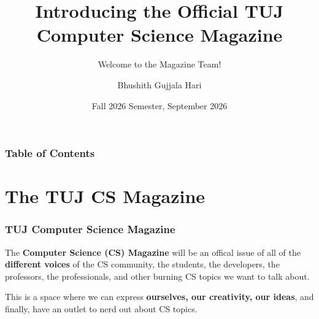 \documentclass{beamer}
\title[Computer Science Magazine]{Introducing the Official TUJ Computer Science Magazine}
\subtitle{Welcome to the Magazine Team!}
\author{Bhushith Gujjala Hari}
\institute{Temple University Japan}
\date[Fall 2026]{Fall 2026 Semester, September 2026}
\begin{document}



\frame{\titlepage}


\begin{frame}
    \frametitle{Table of Contents}
    \tableofcontents
\end{frame}


\section{The TUJ CS Magazine}
\begin{frame}
    \frametitle{TUJ Computer Science Magazine}

    The \textbf{Computer Science (CS) Magazine} will be an offical issue of all of the \textbf{different voices} of the CS community, the students, the developers, the professors, the professionals, and other burning CS topics we want to talk about.

    \hspace{0.4pt}
    \pause

    This is a space where we can express \textbf{ourselves, our creativity, our ideas}, and finally, have an outlet to nerd out about CS topics.  


\end{frame}


\end{document}
